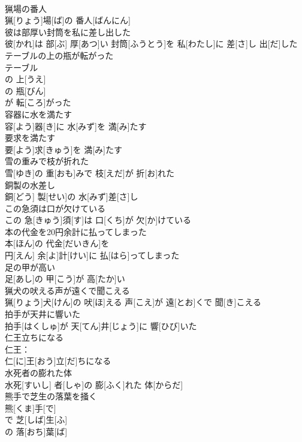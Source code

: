 \documentclass[8pt]{extreport}
\begin{document}
\begin{CJK}{UTF8}{min}
\\	猟場の番人	
\\	猟[りょう]場[ば]の 番人[ばんにん]
\\	彼は部厚い封筒を私に差し出した	
\\	彼[かれ]は 部[ぶ] 厚[あつ]い 封筒[ふうとう]を 私[わたし]に 差[さ]し 出[だ]した
\\	テーブルの上の瓶が転がった	
\\	テーブル 
\\	の 上[うえ]
\\	の 瓶[びん]
\\	が 転[ころ]がった 
\\	容器に水を満たす	
\\	容[よう]器[き]に 水[みず]を 満[み]たす
\\	要求を満たす	
\\	要[よう]求[きゅう]を 満[み]たす
\\	雪の重みで枝が折れた	
\\	雪[ゆき]の 重[おも]みで 枝[えだ]が 折[お]れた
\\	銅製の水差し	
\\	銅[どう] 製[せい]の 水[みず]差[さ]し
\\	この急須は口が欠けている	
\\	この 急[きゅう]須[す]は 口[くち]が 欠[か]けている
\\	本の代金を20円余計に払ってしまった	
\\	本[ほん]の 代金[だいきん]を 
\\	円[えん] 余[よ]計[けい]に 払[はら]ってしまった
\\	足の甲が高い	
\\	足[あし]の 甲[こう]が 高[たか]い
\\	猟犬の吠える声が遠くで聞こえる	
\\	猟[りょう]犬[けん]の 吠[ほ]える 声[こえ]が 遠[とお]くで 聞[き]こえる
\\	拍手が天井に響いた	
\\	拍手[はくしゅ]が 天[てん]井[じょう]に 響[ひび]いた
\\	仁王立ちになる	
\\	仁王：
\\	仁[に]王[おう]立[だ]ちになる
\\	水死者の膨れた体	
\\	水死[すいし] 者[しゃ]の 膨[ふく]れた 体[からだ]
\\	熊手で芝生の落葉を掻く	
\\	熊[くま]手[で]
\\	で 芝[しば]生[ふ]
\\	の 落[おち]葉[ば]

\end{CJK}
\end{document}
